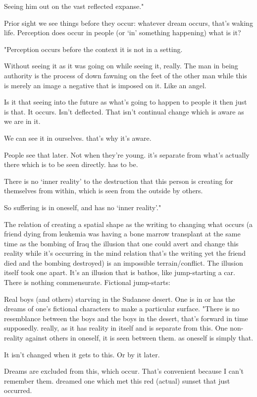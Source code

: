 \documentclass[
]{memoir}
\begin{document}
Seeing him out on the vast reflected expanse."

Prior sight we see things before they occur: whatever dream occurs,
that's waking life. Perception does occur in people (or `in' something
happening) what is it?

"Perception occurs before the context it is not in a setting.

Without seeing it as it was going on while seeing it, really. The man in
being authority is the process of down fawning on the feet of the other
man while this is merely an image a negative that is imposed on it. Like
an angel.

Is it that seeing into the future as what's going to happen to people it
then just is that. It occurs. Isn't deflected. That isn't continual
change which is aware as we are in it.

We can see it in ourselves. that's why it's aware.

People see that later. Not when they're young. it's separate from what's
actually there which is to be seen directly. has to be.

There is no `inner reality' to the destruction that this person is
creating for themselves from within, which is seen from the outside by
others.

So suffering is in oneself, and has no `inner reality'."

The relation of creating a spatial shape as the writing to changing what
occurs (a friend dying from leukemia was having a bone marrow transplant
at the same time as the bombing of Iraq the illusion that one could
avert and change this reality while it's occurring in the mind relation
that's the writing yet the friend died and the bombing destroyed) is an
impossible terrain/conflict. The illusion itself took one apart. It's an
illusion that is bathos, like jump-starting a car. There is nothing
commensurate. Fictional jump-starts:

Real boys (and others) starving in the Sudanese desert. One is in or has
the dreams of one's fictional characters to make a particular surface.
"There is no resemblance between the boys and the boys in the desert,
that's forward in time supposedly. really, as it has reality in itself
and is separate from this. One non-reality against others in oneself, it
is seen between them. as oneself is simply that.

It isn't changed when it gets to this. Or by it later.

Dreams are excluded from this, which occur. That's convenient because I
can't remember them. dreamed one which met this red (actual) sunset that
just occurred.
\end{document}
